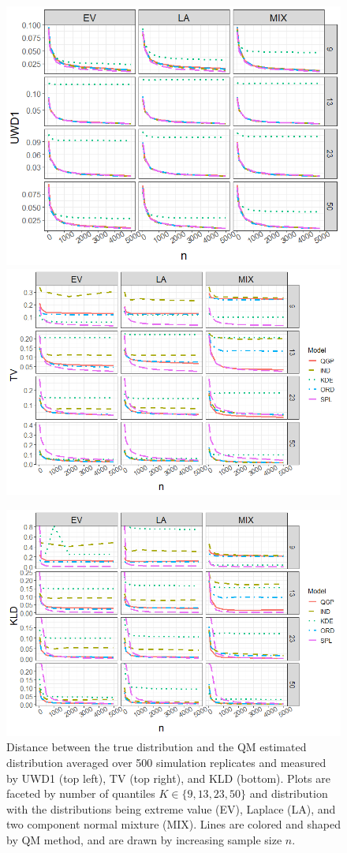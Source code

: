 \documentclass[preprint,12pt,authoryear]{elsarticle}
\begin{document}
\begin{figure}[hbt!]
  \includegraphics[width=.4\linewidth]{Images/uk_uwd1.png}
  \includegraphics[width=.4\linewidth]{Images/uk_tv.png}

\medskip %
  \includegraphics[width=.4\linewidth]{Images/uk_kld.png}
\tiny
\caption{Distance between the true distribution and the QM estimated distribution averaged over 500 simulation replicates and measured by UWD1 (top left), TV (top right), and KLD (bottom). Plots are faceted by number of quantiles $K \in \{9, 13, 23, 50\}$ and distribution with the distributions being extreme value (EV), Laplace (LA), and two component normal mixture (MIX). Lines are colored and shaped by QM method, and are drawn by increasing sample size $n$.}
\label{fig:uk_dists}
\end{figure}
\end{document}
